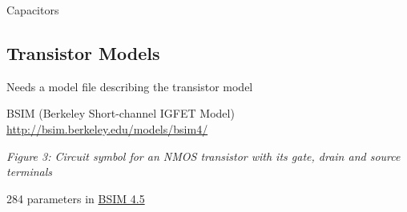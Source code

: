 Capacitors

\begin{Shaded}
\begin{Highlighting}[]
\OperatorTok{\textless{}}\OperatorTok{\textgreater{}} \OperatorTok{\textless{}}\OperatorTok{\textgreater{}} \OperatorTok{\textless{}}\OperatorTok{\textgreater{}} \OperatorTok{\textless{}}\OperatorTok{\textgreater{}}

\end{Highlighting}
\end{Shaded}

\subsection{Transistor Models}\label{transistor-models}

Needs a model file describing the transistor model

BSIM (Berkeley Short-channel IGFET Model)
\url{http://bsim.berkeley.edu/models/bsim4/}


{
\centering
{}
}

\emph{Figure 3: Circuit symbol for an NMOS transistor with its gate,
drain and source terminals}

284 parameters in
\href{http://www-device.eecs.berkeley.edu/~bsim/Files/BSIM4/BSIM480/BSIM480_Manual.pdf}{BSIM
4.5}

